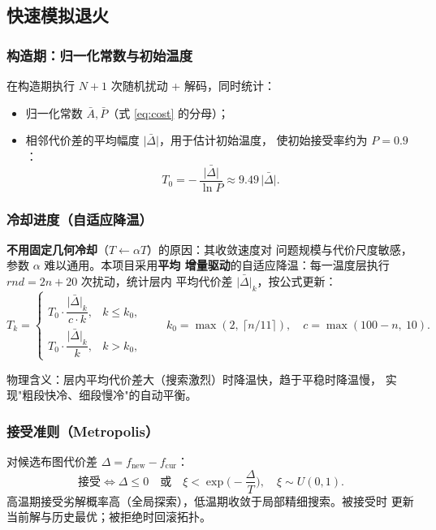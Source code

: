 \documentclass[12pt,a4paper]{article}
\begin{document}
\subsection{快速模拟退火}

\subsubsection{构造期：归一化常数与初始温度}

在构造期执行 $N+1$ 次随机扰动 + 解码，同时统计：

\begin{itemize}
    \item 归一化常数 $\bar A, \bar P$（式 \ref{eq:cost} 的分母）；
    \item 相邻代价差的平均幅度 $\bar{|\Delta|}$，用于估计初始温度，
    使初始接受率约为 $P = 0.9$：
    \begin{equation}
    T_0 = -\,\frac{\bar{|\Delta|}}{\ln P} \approx 9.49 \,\bar{|\Delta|}.
    \end{equation}
\end{itemize}

\subsubsection{冷却进度（自适应降温）}

\textbf{不用固定几何冷却}（$T \leftarrow \alpha T$）的原因：其收敛速度对
问题规模与代价尺度敏感，参数 $\alpha$ 难以通用。本项目采用\textbf{平均
增量驱动}的自适应降温：每一温度层执行 $rnd = 2n + 20$ 次扰动，统计层内
平均代价差 $\bar{|\Delta|}_k$，按公式更新：
\begin{equation}
T_k = \begin{cases}
T_0 \cdot \dfrac{\bar{|\Delta|}_k}{c \cdot k}, & k \le k_0, \\[1.2em]
T_0 \cdot \dfrac{\bar{|\Delta|}_k}{k}, & k > k_0,
\end{cases}
\qquad k_0 = \max(2,\ \lceil n/11 \rceil),\quad c = \max(100 - n,\ 10).
\end{equation}

物理含义：层内平均代价差大（搜索激烈）时降温快，趋于平稳时降温慢，
实现"粗段快冷、细段慢冷"的自动平衡。

\subsubsection{接受准则（Metropolis）}

对候选布图代价差 $\Delta = f_{\text{new}} - f_{\text{cur}}$：
\[
\text{接受} \iff \Delta \le 0 \quad \text{或} \quad \xi < \exp\!\Big(-\frac{\Delta}{T}\Big),\quad \xi \sim U(0,1).
\]
高温期接受劣解概率高（全局探索），低温期收敛于局部精细搜索。被接受时
更新当前解与历史最优；被拒绝时回滚拓扑。
\end{document}
